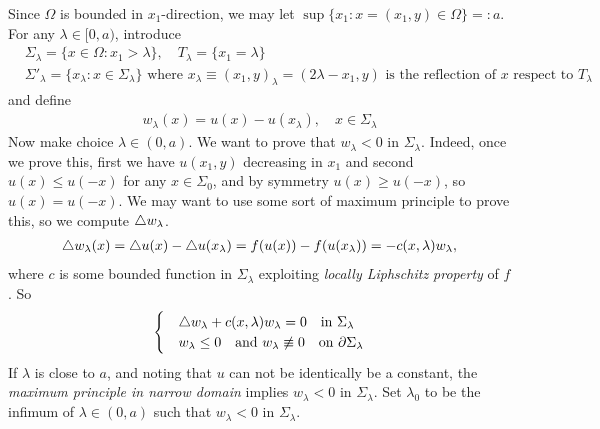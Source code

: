 \documentclass[12pt,a4paper]{article}
\newenvironment{proof}
{\begin{changemargin}{0.5cm}{0.5cm} 
	}%
	{\end{changemargin}
}
\newenvironment{p}
{\begin{proof} 
	}%
	{\end{proof}
}
\begin{document}
\begin{p}
\pf Since $\Omega$ is bounded in $x_1$-direction, we may let $\sup \{x_1 : x= (x_1, y) \in\Omega \} =: a$. For any $\lambda \in [0, a)$, introduce
\begin{align*}
& \Sigma_{\lambda} = \{x\in \Omega : x_1 > \lambda \}, \quad T_{\lambda} = \{x_1 = \lambda \}\\
& \Sigma'_{\lambda} = \{ x_{\lambda} : x \in \Sigma_{\lambda} \} \,\, \text{where } x_{\lambda} \equiv (x_1, y)_{\lambda} = (2\lambda-x_1, y) \text{ is the reflection of } x \text{ respect to } T_{\lambda}
\end{align*}
and define 
\begin{align*}
w_{\lambda}(x) = u(x) - u(x_{\lambda}), \quad x\in \Sigma_{\lambda}
\end{align*}
Now make choice $\lambda \in (0, a)$. We want to prove that $w_{\lambda}<0$ in $\Sigma_{\lambda}$. Indeed, once we prove this, first we have $u(x_1, y)$ decreasing in $x_1$ and second $u(x) \leq u(-x)$ for any $x\in \Sigma_{0}$, and by symmetry $u(x) \geq u(-x)$, so $u(x) = u(-x)$. We may want to use some sort of maximum principle to prove this, so we compute $\triangle w_{\lambda}$.
\begin{align*}
\triangle w_{\lambda}(x) = \triangle u(x) - \triangle u(x_{\lambda}) = f(u(x))- f(u(x_{\lambda})) = -c(x,\lambda) w_{\lambda},
\end{align*}
where $c$ is some bounded function in $\Sigma_{\lambda}$ exploiting \emph{locally Liphschitz property} of $f$. So
\begin{align*}
\begin{cases}
& \triangle w_{\lambda} + c(x, \lambda)w_{\lambda} =0 \quad \text{in } \Sigma_{\lambda} \\
& w_{\lambda} \leq 0 \quad \text{and } w_{\lambda} \not\equiv 0 \quad \text{on } \partial \Sigma_{\lambda}
\end{cases}
\end{align*}
If $\lambda$ is close to $a$, and noting that $u$ can not be identically be a constant, the \emph{maximum principle in narrow domain} implies $w_{\lambda}<0$ in $\Sigma_{\lambda}$. Set $\lambda_0$ to be the infimum of $\lambda \in (0, a)$ such that $w_{\lambda}<0$ in $\Sigma_{\lambda}$.


\end{p}
\end{document}

